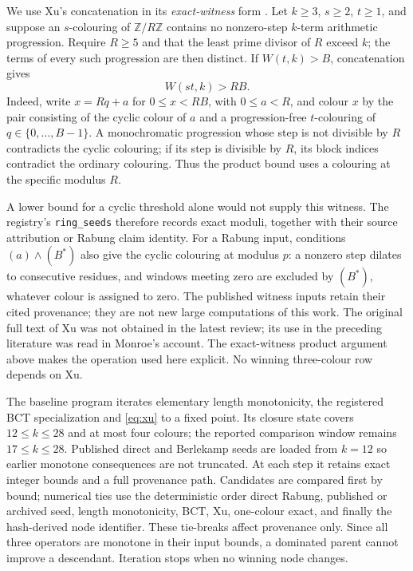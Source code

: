 We use Xu's concatenation in its \emph{exact-witness} form
\cite{xu2013,Monroe2026}. Let $k\ge3$, $s\ge2$, $t\ge1$, and suppose an
$s$-colouring of $\mathbb Z/R\mathbb Z$ contains no nonzero-step $k$-term
arithmetic progression. Require $R\ge5$ and that the least prime divisor
of $R$ exceed $k$; the terms of every such progression are then distinct.
If $W(t,k)>B$, concatenation gives
\begin{equation}\label{eq:xu}
  W(st,k)>RB.
\end{equation}
Indeed, write $x=Rq+a$ for $0\le x<RB$, with $0\le a<R$, and colour $x$
by the pair consisting of the cyclic colour of $a$ and a progression-free
$t$-colouring of $q\in\{0,\ldots,B-1\}$. A monochromatic progression whose
step is not divisible by $R$ contradicts the cyclic colouring; if its step
is divisible by $R$, its block indices contradict the ordinary colouring.
Thus the product bound uses a colouring at the specific modulus $R$.

A lower bound for a cyclic threshold alone would not supply this witness.
The registry's \texttt{ring\_seeds} therefore records exact moduli, together
with their source attribution or Rabung claim identity. For a Rabung input,
conditions $(a)\wedge(B^{*})$ also give the cyclic colouring at modulus $p$:
a nonzero step dilates to consecutive residues, and windows meeting zero
are excluded by $(B^{*})$, whatever colour is assigned to zero.
The published witness inputs retain their cited provenance; they are not
new large computations of this work. The original full text of Xu was not
obtained in the latest review; its use in the preceding literature was read
in Monroe's account. The exact-witness product argument above makes the
operation used here explicit. No winning three-colour row depends on Xu.

The baseline program iterates elementary length monotonicity, the registered
BCT specialization and \eqref{eq:xu} to a fixed point. Its closure state covers
$12\le k\le28$ and at most four colours; the reported comparison window remains
$17\le k\le28$. Published direct and Berlekamp seeds are loaded from $k=12$
so earlier monotone consequences are not truncated. At each step it retains exact integer
bounds and a full provenance path. Candidates are compared first by bound;
numerical ties use the deterministic order direct Rabung, published or archived
seed, length monotonicity, BCT, Xu, one-colour exact, and finally the
hash-derived node identifier. These tie-breaks affect provenance only. Since
all three operators are monotone in their input bounds, a dominated parent
cannot improve a descendant. Iteration stops when no winning node changes.

